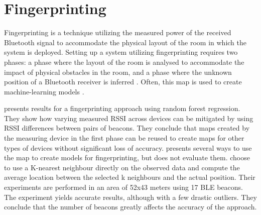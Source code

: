 \section{Fingerprinting}
Fingerprinting is a technique utilizing the measured power of the received Bluetooth signal to accommodate the physical layout of the room in which the system is deployed. 
Setting up a system utilizing fingerprinting requires two phases: a phase where the layout of the room is analysed to accommodate the impact of physical obstacles in the room, and a phase where the unknown position of a Bluetooth receiver is inferred \cite{presence_ble_review, taking_localization_to_the_wild}. Often, this map is used to create machine-learning models \cite{taking_localization_to_the_wild}.

\citeauthor{taking_localization_to_the_wild} \cite{taking_localization_to_the_wild} presents results for a fingerprinting approach using random forest regression.
They show how varying measured RSSI across devices can be mitigated by using RSSI differences between pairs of beacons.
They conclude that maps created by the measuring device in the first phase can be reused to create maps for other types of devices without significant loss of accuracy. 
\citeauthor{presence_ble_review}\cite{presence_ble_review} presents several ways to use the map to create models for fingerprinting, but does not evaluate them.
\citeauthor{improving_indoor_localization} \cite{improving_indoor_localization} choose to use a K-nearest neighbour directly on the observed data and compute the average location between the selected k neighbours and the actual position. 
Their experiments are performed in an area of 52x43 meters using 17 BLE beacons.
The experiment yields accurate results, although with a few drastic outliers. 
They conclude that the number of beacons greatly affects the accuracy of the approach. 


